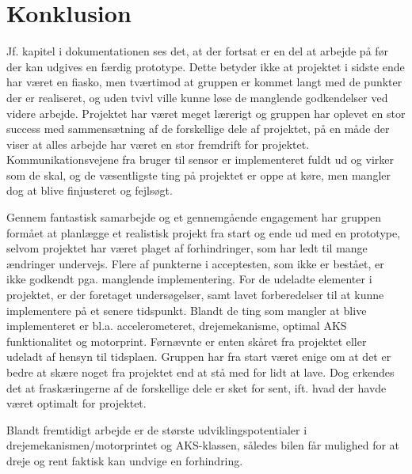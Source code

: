 \chapter{Konklusion}
\label{ch:Konklusion}

Jf. kapitel  i dokumentationen ses det, at der fortsat er en del at arbejde på før der kan udgives en færdig prototype. 
Dette betyder ikke at projektet i sidste ende har været en fiasko, men tværtimod at gruppen er kommet langt med de punkter der er realiseret, og uden tvivl ville kunne løse de manglende godkendelser ved videre arbejde. 
Projektet har været meget lærerigt og gruppen har oplevet en stor success med sammensætning af de forskellige dele af projektet, på en måde der viser at alles arbejde har været en stor fremdrift for projektet. 
Kommunikationsvejene fra bruger til sensor er implementeret fuldt ud og virker som de skal, og de væsentligste ting på projektet er oppe at køre, men mangler dog at blive finjusteret og fejlsøgt. 

Gennem fantastisk samarbejde og et gennemgående engagement har gruppen formået at planlægge et realistisk projekt fra start og ende ud med en prototype, selvom projektet har været plaget af forhindringer, som har ledt til mange ændringer undervejs. 
Flere af punkterne i acceptesten, som ikke er bestået, er ikke godkendt pga. manglende implementering. 
For de udeladte elementer i projektet, er der foretaget undersøgelser, samt lavet forberedelser til at kunne implementere på et senere tidspunkt. 
Blandt de ting som mangler at blive implementeret er bl.a. accelerometeret, drejemekanisme, optimal AKS funktionalitet og motorprint. 
Førnævnte er enten skåret fra projektet eller udeladt af hensyn til tidsplaen. Gruppen har fra start været enige om at det er bedre at skære noget fra projektet end at stå med for lidt at lave. 
Dog erkendes det at fraskæringerne af de forskellige dele er sket for sent, ift. hvad der havde været optimalt for projektet.

Blandt fremtidigt arbejde er de største udviklingspotentialer i drejemekanismen/motorprintet  og AKS-klassen, således bilen får mulighed for at dreje og rent faktisk kan undvige en forhindring.


